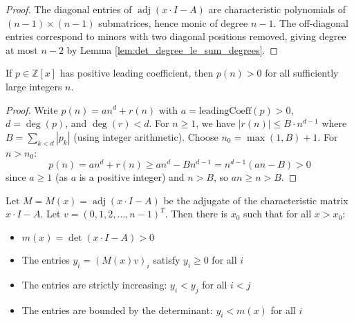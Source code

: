 \begin{proof}
The diagonal entries of $\operatorname{adj}(x\cdot I - A)$ are characteristic polynomials of $(n-1) \times (n-1)$ submatrices, 
hence monic of degree $n-1$. The off-diagonal entries correspond to minors with two diagonal positions removed, 
giving degree at most $n-2$ by Lemma \ref{lem:det_degree_le_sum_degrees}.
\end{proof}

\begin{lemma}
\label{lem:polynomial_positive_for_largeZ}
\leanok
If $p \in \mathbb{Z}[x]$ has positive leading coefficient, then $p(n) > 0$ for all sufficiently large integers $n$.
\end{lemma}

\begin{proof}
Write $p(n) = an^d + r(n)$ with $a = \text{leadingCoeff}(p) > 0$, $d = \deg(p)$, and $\deg(r) < d$.
For $n \geq 1$, we have $|r(n)| \leq B \cdot n^{d-1}$ where $B = \sum_{k < d} |p_k|$ (using integer arithmetic).
Choose $n_0 = \max(1, B) + 1$. For $n > n_0$:
$$p(n) = an^d + r(n) \geq an^d - Bn^{d-1} = n^{d-1}(an - B) > 0$$
since $a \geq 1$ (as $a$ is a positive integer) and $n > B$, so $an \geq n > B$.
\end{proof}

\begin{lemma}
\label{lem:adj_poly_strict_increasing}
Let $M = M(x) = \operatorname{adj}(x\cdot I - A)$ be the adjugate of the characteristic matrix $x\cdot I - A$.
Let $v = (0,1,2,\ldots,n-1)^T$. Then there is $x_0$ such that for all $x > x_0$:
\begin{itemize}
\item $m(x) = \det(x\cdot I - A) > 0$
\item The entries $y_i = (M(x)v)_i$ satisfy $y_i \geq 0$ for all $i$
\item The entries are strictly increasing: $y_i < y_j$ for all $i < j$
\item The entries are bounded by the determinant: $y_i < m(x)$ for all $i$
\end{itemize}
\end{lemma}

